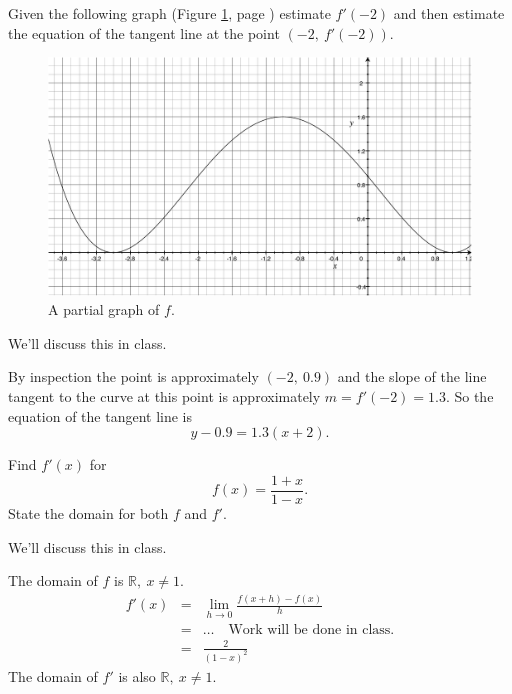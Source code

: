 \documentclass[12pt,addpoints, answers, fleqn]{exam}
\begin{document}
\begin{questions}
\question Given the following graph (Figure \ref{fig:graph0901}, page \pageref{fig:graph0901}) estimate $f'\left(-2\right)$ and then estimate the equation of the tangent line at the point $\left( -2, \ f'\left(-2\right)\right)$.
\begin{figure}[htbp] %
   \centering
   \includegraphics[width=5in]{./graphics/graph0901.pdf} 
   \caption{A partial graph of $f$.}
   \label{fig:graph0901}
\end{figure}

\begin{solution}
We'll discuss this in class.

By inspection the point is approximately $\left( -2, \ 0.9 \right)$ and the slope of the line tangent to the curve at this point is approximately $m =f'\left(-2\right)= 1.3$. So the equation of the tangent line is
\[
y - 0.9 = 1.3 \left( x + 2\right).
\]
\end{solution}

\question Find $f'\left(x\right)$ for
\[
f \left( x \right) = \frac{1 + x}{1 - x}.
\]
State the domain for both $f$ and $f'$.

\begin{solution}
We'll discuss this in class.

The domain of $f$ is $\mathbb{R}, \ x \neq 1$.
\begin{eqnarray*}
f' \left( x \right) &=& \lim_{h \to 0 }  \frac{f \left( x+h \right) - f \left( x \right)}{h}\\
&=& \ldots \quad \mbox{Work will be done in class.}\\
&=&\frac{2}{\left( 1-x\right)^2}
\end{eqnarray*}
The domain of $f'$ is also $\mathbb{R}, \ x \neq 1$.
\end{solution}




\end{questions}
\end{document}
